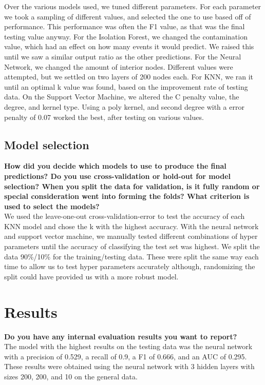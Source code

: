 \documentclass[11pt,a4paper]{article}
\begin{document}
Over the various models used, we tuned different parameters.
For each parameter we took a sampling of different values, and selected the one to use based off of performance.
This performance was often the F1 value, as that was the final testing value anyway.
For the Isolation Forest, we changed the contamination value, which had an effect on how many events it would predict.
We raised this until we saw a similar output ratio as the other predictions.
For the Neural Network, we changed the amount of interior nodes.
Different values were attempted, but we settled on two layers of 200 nodes each.
For KNN, we ran it until an optimal k value was found, based on the improvement rate of testing data.
On the Support Vector Machine, we altered the C penalty value, the degree, and kernel type.
Using a poly kernel, and second degree with a error penalty of 0.07 worked the best, after testing on various values.

\subsection{Model selection}
\textbf{How did you decide which models to use to produce the final predictions?  Do you use cross-validation or hold-out for model selection? When you split the data for validation, is it fully random or special consideration went into forming the folds? What criterion is used to select the models?}\\

We used the leave-one-out cross-validation-error to test the accuracy of each KNN model and chose the k with the highest accuracy. With the neural network and support vector machine, we manually tested different combinations of hyper parameters until the accuracy of classifying the test set was highest. We split the data 90\%/10\% for the training/testing data. These were split the same way each time to allow us to test hyper parameters accurately although, randomizing the split could have provided us with a more robust model.

\section{Results}
\textbf{Do you have any internal evaluation results you want to report?}\\
The model with the highest results on the testing data was the neural network with a precision of 0.529, a recall of 0.9, a F1 of 0.666, and an AUC of 0.295. These results were obtained using the neural network with 3 hidden layers with sizes 200, 200, and 10 on the general data.
\end{document}
